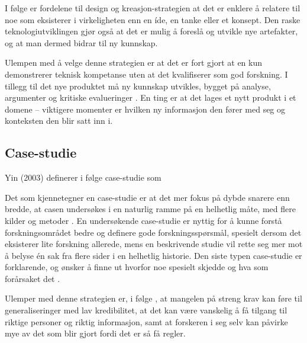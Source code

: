 I følge \citet[s.121-122]{oates} er fordelene til design og kreasjon-strategien at det er enklere å relatere til noe
som eksisterer i virkeligheten enn en íde, en tanke eller et konsept.
Den raske teknologiutviklingen gjør også at det er mulig å foreslå og utvikle nye artefakter, og at man dermed bidrar til ny kunnskap.

Ulempen med å velge denne strategien er at det er fort gjort at en kun demonstrerer
teknisk kompetanse uten at det kvalifiserer som god forskning. I tillegg til det nye produktet må ny kunnskap utvikles, bygget
på analyse, argumenter og kritiske evalueringer \citep[s. 109]{oates}. En ting er at det lages et nytt produkt i et domene --
viktigere momenter er hvilken ny informasjon den fører med seg og konteksten den blir satt inn i.

\subsection{Case-studie}
Yin (2003) definerer i følge \citet{oates} case-studie som 

Det som kjennetegner en case-studie er at det mer fokus på dybde snarere enn bredde,
at casen undersøkes i en naturlig ramme på en helhetlig måte, med flere kilder og metoder \citep[s. 142]{oates}. En undersøkende case-studie er nyttig for å kunne forstå
forskningsområdet bedre og definere gode forskningsspørsmål,
spesielt dersom det eksisterer lite forskning allerede, mens en beskrivende studie vil rette seg mer
mot å belyse én sak fra flere sider i en helhetlig historie. Den siste typen
case-studie er forklarende, og ønsker å finne ut hvorfor noe spesielt skjedde og hva
som forårsaket det \citep[s. 143]{oates}.

Ulemper med denne strategien er, i følge \citet{oates}, at mangelen på streng krav kan føre til generaliseringer med
lav kredibilitet, at det kan være
vanskelig å få tilgang til riktige personer og riktig informasjon, samt at forskeren i seg selv kan påvirke mye av det som blir gjort fordi det er
så få regler.
    
